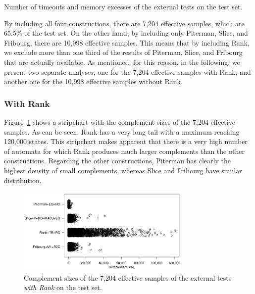 \begin{table}[ht]
\centering

\caption{Number of timeouts and memory excesses of the external tests on the \goal{} test set.}
\label{e.g.outs}
\end{table}

By including all four constructions, there are 7,204 effective samples, which are 65.5\% of the test set. On the other hand, by including only Piterman, Slice, and Fribourg, there are 10,998 effective samples. This means that by including Rank, we exclude more than one third of the results of Piterman, Slice, and Fribourg that are actually available. As mentioned, for this reason, in the following, we present two separate analyses, one for the 7,204 effective samples with Rank, and another one for the 10,998 effective samples without Rank.

\subsubsection{With Rank}
Figure~\ref{e.g.stripchart.with_rank} shows a stripchart with the complement sizes of the 7,204 effective samples. As can be seen, Rank has a very long tail with a maximum reaching 120,000 states. This stripchart makes apparent that there is a very high number of automata for which Rank produces much larger complements than the other constructions. Regarding the other constructions, Piterman has clearly the highest density of small complements, whereas Slice and Fribourg have similar distribution.

\begin{figure}[htb]
\centering
\includegraphics[width=0.75\textwidth]{figures/r/external/goal/s.stripchart.with_rank.pdf}
\caption{Complement sizes of the 7,204 effective samples of the external tests \textit{with Rank} on the \goal{} test set.}
\label{e.g.stripchart.with_rank}
\end{figure}

